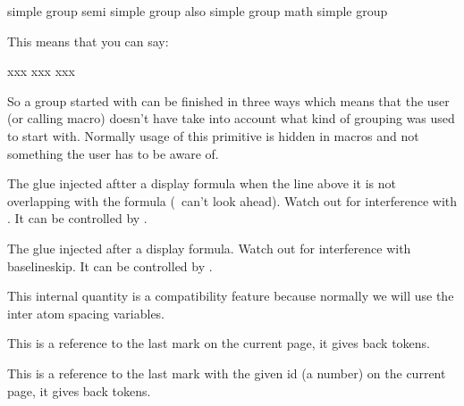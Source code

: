 \starttabulate[||||]
\NC simple group      \NC \type {\bgroup}           \NC \type {\egroup} \NC \NR
\NC semi simple group \NC \type {\begingroup}       \NC \type {\endgroup} \type {\endsimplegroup} \NC \NR
\NC also simple group \NC \type {\beginsimplegroup} \NC \type {\egroup} \type {\endgroup} \type {\endsimplegroup} \NC \NR
\NC math simple group \NC \type {\beginmathgroup}   \NC \type {\endmathgroup} \NC \NR
\stoptabulate

This means that you can say:

\starttyping
\beginsimplegroup xxx\endsimplegroup
\beginsimplegroup xxx\endgroup
\beginsimplegroup xxx\egroup
\stoptyping

So a group started with  can be finished in three ways
which means that the user (or calling macro) doesn't have take into account what
kind of grouping was used to start with. Normally usage of this primitive is
hidden in macros and not something the user has to be aware of.

\stopnewprimitive

\startoldprimitive[title={\prm {belowdisplayshortskip}}]

The glue injected aftter a display formula when the line above it is not
overlapping with the formula (\TEX\ can't look ahead). Watch out for interference
with . It can be controlled by .

\stopoldprimitive

\startoldprimitive[title={\prm {belowdisplayskip}}]

The glue injected after a display formula. Watch out for interference with \prm
{baselineskip}. It can be controlled by .

\stopoldprimitive

\startoldprimitive[title={\prm {binoppenalty}}][obsolete=yes]

This internal quantity is a compatibility feature because normally we will use
the inter atom spacing variables.

\stopoldprimitive

\startoldprimitive[title={\prm {botmark}}][obsolete=yes]

This is a reference to the last mark on the current page, it gives back tokens.

\stopoldprimitive

\startoldprimitive[title={\prm {botmarks}}]

This is a reference to the last mark with the given id (a number) on the current
page, it gives back tokens.

